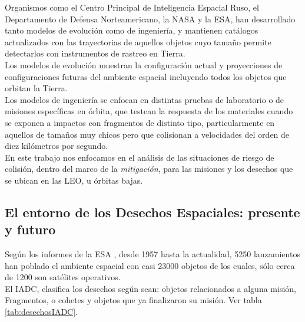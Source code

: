 Organismos como el Centro Principal de Inteligencia Espacial Ruso, el Departamento de Defensa Norteamericano, la NASA y la \ac{ESA}, han desarrollado tanto modelos de evoluci\'on como de ingenier\'ia, y mantienen cat\'alogos actualizados con las trayectorias de aquellos objetos cuyo tama\~no permite detectarlos con instrumentos de rastreo en Tierra.\\

Los modelos de evoluci\'on muestran la configuraci\'on actual y proyecciones de configuraciones futuras del ambiente espacial incluyendo todos los objetos que orbitan la Tierra.\\

Los modelos de ingenier\'ia se enfocan en distintas pruebas de laboratorio o de misiones espec\'ificas en \'orbita, que testean la respuesta de los materiales cuando se exponen a impactos con fragmentos de distinto tipo, particularmente en aquellos de tama\~nos muy chicos pero que colisionan a velocidades del orden de diez kil\'ometros por segundo.\\

En este trabajo nos enfocamos en el an\'alisis de las situaciones de riesgo de colisi\'on, dentro del marco de la {\it{mitigaci\'on}}, para las misiones y los desechos que se ubican en las  \ac{LEO}, u \'orbitas bajas.\\

\subsection*{El entorno de los Desechos Espaciales: presente y futuro}
Seg\'un los informes de la \ac{ESA} \citep{esaSD}, desde 1957 hasta la actualidad, 5250 lanzamientos han poblado el ambiente espacial con casi 23000 objetos de los cuales, s\'olo cerca de 1200 son sat\'elites operativos.\\

El \ac{IADC}, clasifica los desechos seg\'un sean: objetos relacionados a alguna misi\'on, Fragmentos, o cohetes y objetos que ya finalizaron su misi\'on. Ver tabla \ref{tab:desechosIADC}.\\


